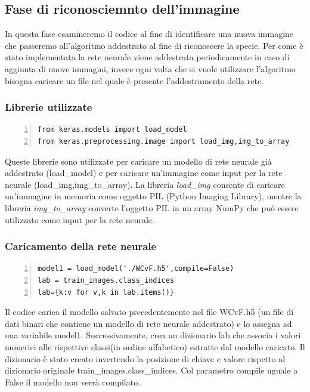 \documentclass[a4paper,final,12pt]{report}
\begin{document}
\subsection{Fase di riconosciemnto dell'immagine}
In questa fase esamineremo il codice al fine di identificare una nuova immagine che passeremo all'algoritmo addestrato al fine di riconoscere la specie. Per come è stato implementata la rete neurale viene addestrata periodicamente in caso di aggiunta di nuove immagini, invece ogni volta che si vuole utilizzare l'algoritmo bisogna caricare un file nel quale è presente l'addestramento della rete.

\subsubsection{Librerie utilizzate}
\begin{lstlisting}[caption={Librerie per il riconosciemtno dell'immagine.}, label={lst:librerie_riconoscimento}, breaklines, escapechar=`\%, frame=lines, basicstyle=\small\ttfamily, keepspaces=true, numbers=left]
from keras.models import load_model
from keras.preprocessing.image import load_img,img_to_array
\end{lstlisting}
Queste librerie sono utilizzate per caricare un modello di rete neurale già addestrato (load\_model) e per caricare un'immagine come input per la rete neurale (load\_img,img\_to\_array). La libreria \textit{load\_img} consente di caricare un'immagine in memoria come oggetto PIL (Python Imaging Library), mentre la libreria \textit{img\_to\_array} converte l'oggetto PIL in un array NumPy che può essere utilizzato come input per la rete neurale.

\subsubsection{Caricamento della rete neurale}
\begin{lstlisting}[caption={Codice di caricamento della rete neurale.}, label={lst:caricamento_rete}, breaklines, escapechar=`\%, frame=lines, basicstyle=\small\ttfamily, keepspaces=true, numbers=left]
model1 = load_model('./WCvF.h5',compile=False)
lab = train_images.class_indices
lab={k:v for v,k in lab.items()}
\end{lstlisting}
Il codice carica il modello salvato precedentemente nel file WCvF.h5 (un file di dati binari che contiene un modello di rete neurale addestrato) e lo assegna ad una variabile model1. Successivamente, crea un dizionario lab che associa i valori numerici alle rispettive classi(in ordine alfabetico) estratte dal modello caricato. Il dizionario è stato creato invertendo la posizione di chiave e valore rispetto al dizionario originale train\_images.class\_indices. Col parametro compile uguale a False il modello non verrà compilato.
\end{document}
